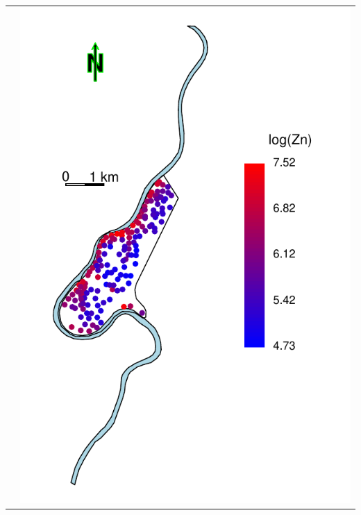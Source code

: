 \documentclass[mathserif,compress]{beamer}\usepackage{graphicx, color}
\makeatletter
\def\maxwidth{ %
  \ifdim\Gin@nat@width>\linewidth
    \linewidth
  \else
    \Gin@nat@width
  \fi
}
\newenvironment{knitrout}{}{} %
\makeatother
\begin{document}
\begin{frame} [fragile]
\begin{tabular} {p{4.5cm} p{4.5cm}}
\begin{knitrout}
\end{knitrout}

 &


\begin{knitrout}\tiny
\definecolor{shadecolor}{rgb}{0.969, 0.969, 0.969}\color{fgcolor}

{\centering \includegraphics[width=\maxwidth]{figure/colorPointsMeuseLogZN-plot} 

}



\end{knitrout}

	\end{tabular}

\end{frame}
\end{document}
